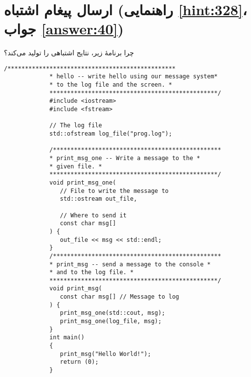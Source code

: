 \section[ارسال پیغام اشتباه]{ارسال پیغام اشتباه \protect{} (راهنمایی \ref{hint:328}، جواب \ref{answer:40})}
\paragraph{}\label{prog:95}
چرا برنامهٔ زیر، نتایج اشتباهی را تولید می‌کند؟

\begin{LTR}
        \begin{lstlisting}[style=C++Style]
             /************************************************
             * hello -- write hello using our message system*
             * to the log file and the screen. *
             ************************************************/
             #include <iostream>
             #include <fstream>

             // The log file
             std::ofstream log_file("prog.log");

             /************************************************
             * print_msg_one -- Write a message to the *
             * given file. *
             ************************************************/
             void print_msg_one(
             	// File to write the message to
             	std::ostream out_file,

             	// Where to send it
             	const char msg[]
             ) {
             	out_file << msg << std::endl;
             }
             /************************************************
             * print_msg -- send a message to the console *
             * and to the log file. *
             ************************************************/
             void print_msg(
             	const char msg[] // Message to log
             ) {
             	print_msg_one(std::cout, msg);
             	print_msg_one(log_file, msg);
             }
             int main()
             {
             	print_msg("Hello World!");
             	return (0);
             }
        \end{lstlisting}
\end{LTR}